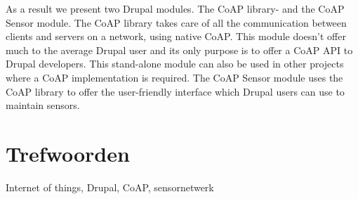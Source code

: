{As a result we present two Drupal modules. The CoAP library- and the CoAP Sensor module. The CoAP library takes care of all the communication between clients and servers on a network, using native CoAP. This module doesn’t offer much to the average Drupal user and its only purpose is to offer a CoAP API to Drupal developers. This stand-alone module can also be used in other projects where a CoAP implementation is required. The CoAP Sensor module uses the CoAP library to offer the user-friendly interface which Drupal users can use to maintain sensors.
\section*{Trefwoorden}


Internet of things, Drupal, CoAP, sensornetwerk

}

\newpage %
